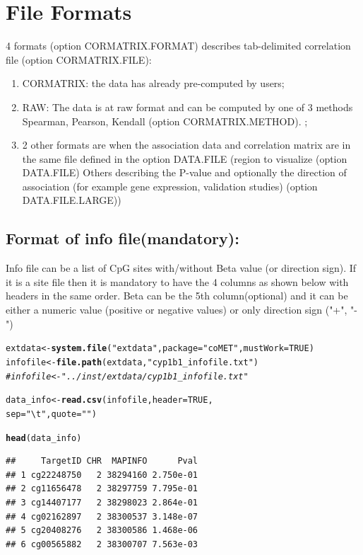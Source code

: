 \documentclass[11pt]{article}\usepackage[]{graphicx}\usepackage[usenames,dvipsnames]{color}
\makeatletter
\newcommand{\hlnum}[1]{\textcolor[rgb]{0.686,0.059,0.569}{#1}}%
\newcommand{\hlstr}[1]{\textcolor[rgb]{0.192,0.494,0.8}{#1}}%
\newcommand{\hlcom}[1]{\textcolor[rgb]{0.678,0.584,0.686}{\textit{#1}}}%
\newcommand{\hlstd}[1]{\textcolor[rgb]{0.345,0.345,0.345}{#1}}%
\newcommand{\hlkwb}[1]{\textcolor[rgb]{0.69,0.353,0.396}{#1}}%
\newcommand{\hlkwc}[1]{\textcolor[rgb]{0.333,0.667,0.333}{#1}}%
\newcommand{\hlkwd}[1]{\textcolor[rgb]{0.737,0.353,0.396}{\textbf{#1}}}%
\newenvironment{kframe}{%
 \def\at@end@of@kframe{}%
 \ifinner\ifhmode%
  \def\at@end@of@kframe{\end{minipage}}%
  \begin{minipage}{\columnwidth}%
 \fi\fi%
 \def\FrameCommand##1{\hskip\@totalleftmargin \hskip-\fboxsep
 \colorbox{shadecolor}{##1}\hskip-\fboxsep
     \hskip-\linewidth \hskip-\@totalleftmargin \hskip\columnwidth}%
 \MakeFramed {\advance\hsize-\width
   \@totalleftmargin\z@ \linewidth\hsize
   \@setminipage}}%
 {\par\unskip\endMakeFramed%
 \at@end@of@kframe}
\newenvironment{knitrout}{}{} %
\makeatother
\begin{document}
\section{File Formats}
4 formats (option CORMATRIX.FORMAT) describes tab-delimited correlation file 
(option CORMATRIX.FILE): 
\begin{enumerate}
\item CORMATRIX: the data has already pre-computed by users; 
\item RAW: The data is at raw format and can be computed by one of 3 methods 
Spearman, Pearson, Kendall (option CORMATRIX.METHOD). ; 
\item 2 other formats are when the association data and correlation matrix are in the 
same file defined in the option DATA.FILE (region to visualize (option DATA.FILE) 
Others describing the P-value and optionally the direction of association (for example gene expression, validation studies) (option DATA.FILE.LARGE)) 
\end{enumerate}


\subsection{Format of info file(mandatory):}
Info file can be a list of CpG sites with/without Beta value (or direction sign). If it is a site file then it is mandatory to have the 4 columns as shown below with headers in the same order. Beta can be the 5th column(optional) and it can be either a numeric value (positive or negative values) or only direction sign ("+", "-")

\begin{knitrout}
\color{fgcolor}\begin{kframe}
\begin{alltt}
\hlstd{extdata} \hlkwb{<-} \hlkwd{system.file}\hlstd{(}\hlstr{"extdata"}\hlstd{,} \hlkwc{package}\hlstd{=}\hlstr{"coMET"}\hlstd{,}\hlkwc{mustWork}\hlstd{=}\hlnum{TRUE}\hlstd{)}
\hlstd{infofile} \hlkwb{<-} \hlkwd{file.path}\hlstd{(extdata,} \hlstr{"cyp1b1_infofile.txt"}\hlstd{)}
\hlcom{#infofile <- "../inst/extdata/cyp1b1_infofile.txt" }

\hlstd{data_info} \hlkwb{<-}\hlkwd{read.csv}\hlstd{(infofile,} \hlkwc{header} \hlstd{=} \hlnum{TRUE}\hlstd{,}
                     \hlkwc{sep} \hlstd{=} \hlstr{"\textbackslash{}t"}\hlstd{,} \hlkwc{quote} \hlstd{=} \hlstr{""}\hlstd{)}

\hlkwd{head}\hlstd{(data_info)}
\end{alltt}
\begin{verbatim}
##     TargetID CHR  MAPINFO      Pval
## 1 cg22248750   2 38294160 2.750e-01
## 2 cg11656478   2 38297759 7.795e-01
## 3 cg14407177   2 38298023 2.864e-01
## 4 cg02162897   2 38300537 3.148e-07
## 5 cg20408276   2 38300586 1.468e-06
## 6 cg00565882   2 38300707 7.563e-03
\end{verbatim}
\end{kframe}
\end{knitrout}
\end{document}
